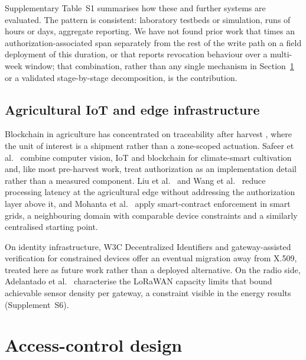 \documentclass[a4paper,fleqn]{cas-sc}
\begin{document}
Supplementary Table~S1 summarises how these and further systems
\cite{zaidi2023fabrication,bandara2021modeling} are evaluated. The pattern
is consistent: laboratory testbeds or simulation, runs of hours or days,
aggregate reporting. We have not found prior work that times an
authorization-associated span separately from the rest of the write path on
a field deployment of this duration, or that reports revocation behaviour
over a multi-week window; that combination, rather than any single
mechanism in Section~\ref{sec:design} or a validated stage-by-stage
decomposition, is the contribution.

\subsection{Agricultural IoT and edge infrastructure}
\label{subsec:rw_agri}

Blockchain in agriculture has concentrated on traceability after harvest
\cite{tian2017traceability,lin2018blockchain,bandara2021modeling}, where the
unit of interest is a shipment rather than a zone-scoped actuation. Safeer et
al.\ \cite{safeer2025agrifarming} combine computer vision, IoT and blockchain
for climate-smart cultivation and, like most pre-harvest work, treat
authorization as an implementation detail rather than a measured component.
Liu et al.\ \cite{liu2019edge} and Wang et al.\ \cite{wang2021edge} reduce
processing latency at the agricultural edge without addressing the
authorization layer above it, and Mohanta et al.\ \cite{mohanta2025smartgrid}
apply smart-contract enforcement in smart grids, a neighbouring domain with
comparable device constraints and a similarly centralised starting point.

On identity infrastructure, W3C Decentralized Identifiers
\cite{w3c_did_core} and gateway-assisted verification for constrained devices
\cite{ferdous2019ssi,tara2023decentralized} offer an eventual migration away
from X.509, treated here as future work rather than a deployed alternative.
On the radio side, Adelantado et al.\ \cite{adelantado2017understanding}
characterise the LoRaWAN capacity limits that bound achievable sensor density
per gateway, a constraint visible in the energy results (Supplement~S6).

\section{Access-control design}
\label{sec:design}
\end{document}
